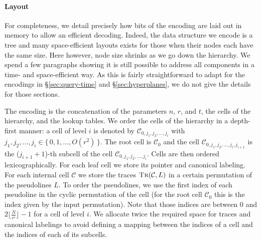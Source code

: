 \paragraph*{Layout}
For completeness, we detail precisely how bits of the encoding are
laid out in memory to allow an efficient decoding.
%
Indeed, the data structure we encode is a tree and many space-efficient layouts
exists for those when their nodes each have the same size. Here however, node
size shrinks as we go down the hierarchy.
We spend a few paragraphs showing it
is still possible to
address all components in a
time- and space-efficient way.
%
As this is fairly straightforward to adapt for the encodings in
\S\ref{sec:query-time} and \S\ref{sec:hyperplanes},
we do not give the details for those sections.
%


The encoding is the concatenation of
the parameters \(n\), \(r\), and \( t\),
the cells of the hierarchy,
and
the lookup tables.
%
We order the cells of the hierarchy in a depth-first manner: a cell of level
\(i\) is denoted by \(\mathcal{C}_{0, j_1, j_2, \ldots, j_i}\)
with \(j_1, j_2, \ldots, j_i \in \{\, 0, 1, \ldots, O(r^2)\,\}\).
The root cell is
\(\mathcal{C}_0\) and the cell \(\mathcal{C}_{0, j_1, j_2, \ldots, j_i, j_{i+1}}\) is
the (\(j_{i+1} + 1\))-th subcell of the cell
\(\mathcal{C}_{0, j_1, j_2, \ldots, j_i}\).
%
Cells are then ordered lexicographically.
%
For each leaf cell we store its pointer and canonical labeling.
%
For each internal cell \(\mathcal{C}\) we store the traces
\(\textsc{Tr}(\mathcal{C}, L)\) in a certain permutation of the pseudolines
\(L\).
%
To order the pseudolines, we use the first index of each pseudoline
in the cyclic permutation of the cell (for the root cell \(\mathcal{C}_0\) this
is the index given by the input permutation).
%
Note that those indices are between \(0\) and \(2 \lfloor \frac{N}{r^{i}}
\rfloor - 1\) for a cell of level \(i\). We allocate twice the required space
for traces and canonical labelings to avoid defining a mapping between the
indices of a cell and the indices of each of its subcells.

